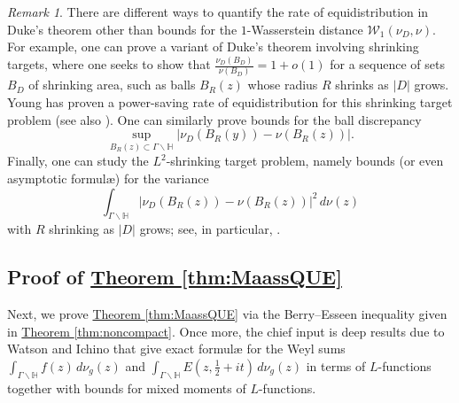 \documentclass[11pt,a4paper]{amsart}
\newcommand{\Hb}{\mathbb{H}}
\newcommand{\Wscr}{\mathscr{W}}
\numberwithin{equation}{section}
\theoremstyle{remark}
\newtheorem{remark}[equation]{Remark}
\theoremstyle{definition}
\begin{document}
\begin{remark}
There are different ways to quantify the rate of equidistribution in Duke's theorem other than bounds for the $1$-Wasserstein distance $\Wscr_1(\nu_D,\nu)$. For example, one can prove a variant of Duke's theorem involving shrinking targets, where one seeks to show that $\frac{\nu_D(B_D)}{\nu(B_D)} = 1 + o(1)$ for a sequence of sets $B_D$ of shrinking area, such as balls $B_R(z)$ whose radius $R$ shrinks as $|D|$ grows. Young \cite[Theorem 2.1]{You17} has proven a power-saving rate of equidistribution for this shrinking target problem (see also \cite[Theorem 1.24]{Hum18}). One can similarly prove bounds for the ball discrepancy
\[\sup_{B_R(z) \subset \Gamma \backslash \Hb} \left|\nu_D(B_R(y)) - \nu(B_R(z))\right|.\]
Finally, one can study the $L^2$-shrinking target problem, namely bounds (or even asymptotic formul\ae{}) for the variance
\[\int_{\Gamma \backslash \Hb} \left|\nu_D(B_R(z)) - \nu(B_R(z))\right|^2 \, d\nu(z)\]
with $R$ shrinking as $|D|$ grows; see, in particular, \cite{Fav22,Hum18,HR22}.
\end{remark}


\subsection{Proof of \texorpdfstring{\hyperref[thm:MaassQUE]{Theorem \ref*{thm:MaassQUE}}}{Theorem \ref{thm:MaassQUE}}}

Next, we prove \hyperref[thm:MaassQUE]{Theorem \ref*{thm:MaassQUE}} via the Berry--Esseen inequality given in \hyperref[thm:noncompact]{Theorem \ref*{thm:noncompact}}. Once more, the chief input is deep results due to Watson and Ichino that give exact formul\ae{} for the Weyl sums $\int_{\Gamma \backslash \Hb} f(z) \, d\nu_g(z)$ and $\int_{\Gamma \backslash \Hb} E(z,\frac{1}{2} + it) \, d\nu_g(z)$ in terms of $L$-functions together with bounds for mixed moments of $L$-functions.
\end{document}
